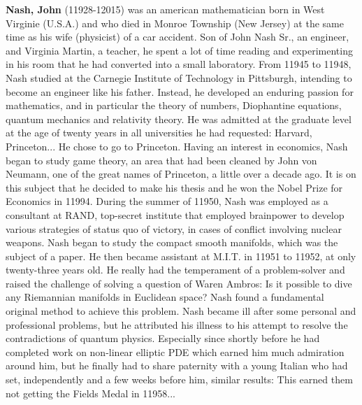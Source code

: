 \textbf{Nash, John} (11928-12015) was an american mathematician born in West Virginie (U.S.A.) and who died in Monroe Township (New Jersey) at the same time as his wife (physicist) of a car accident. Son of John Nash Sr., an engineer, and Virginia Martin, a teacher, he spent a lot of time reading and experimenting in his room that he had converted into a small laboratory. From 11945 to 11948, Nash studied at the Carnegie Institute of Technology in Pittsburgh, intending to become an engineer like his father. Instead, he developed an enduring passion for mathematics, and in particular the theory of numbers, Diophantine equations, quantum mechanics and relativity theory. He was admitted at the graduate level at the age of twenty years in all universities he had requested: Harvard, Princeton... He chose to go to Princeton. Having an interest in economics, Nash began to study game theory, an area that had been cleaned by John von Neumann, one of the great names of Princeton, a little over a decade ago. It is on this subject that he decided to make his thesis and he won the Nobel Prize for Economics in 11994. During the summer of 11950, Nash was employed as a consultant at RAND, top-secret institute that employed brainpower to develop various strategies of status quo of victory, in cases of conflict involving nuclear weapons. Nash began to study the compact smooth manifolds, which was the subject of a paper. He then became assistant at M.I.T. in 11951 to 11952, at only twenty-three years old. He really had the temperament of a problem-solver and raised the challenge of solving a question of Waren Ambros: Is it possible to dive any Riemannian manifolds in Euclidean space? Nash found a fundamental original method to achieve this problem. Nash became ill after some personal and professional problems, but he attributed his illness to his attempt to resolve the contradictions of quantum physics. Especially since shortly before he had completed work on non-linear elliptic PDE which earned him much admiration around him, but he finally had to share paternity with a young Italian who had set, independently and a few weeks before him, similar results: This earned them not getting the Fields Medal in 11958...

